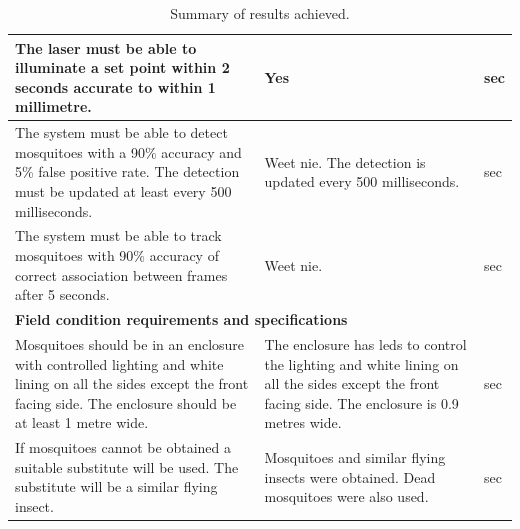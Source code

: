 \begin{table}[H]
\begin{tabularx}{\textwidth}{|X|X|l|}
    \hline
    The laser must be able to illuminate a set point within 2 seconds accurate to within 1 millimetre.                                                                           &
    Yes                                                                                                                                                                          &
    sec                                                                                                                                                                                                                                                                                                                                          \\
    \hline
    The system must be able to detect mosquitoes with a 90\% accuracy and 5\% false positive rate. The detection must be updated at least every 500 milliseconds.                & Weet nie. The detection is updated every 500 milliseconds.                                                                                              & sec \\
    \hline
    The system must be able to track mosquitoes with 90\% accuracy of correct association between frames after 5 seconds.                                                        & Weet nie.                                                                                                                                               & sec \\
    \hline
    \multicolumn{3}{|l|}{\textbf{Field condition requirements and specifications}}                                                                                                                                                                                                                                                               \\
    \hline
    Mosquitoes should be in an enclosure with controlled lighting and white lining on all the sides except the front facing side. The enclosure should be at least 1 metre wide. & The enclosure has \glspl{led} to control the lighting and white lining on all the sides except the front facing side. The enclosure is 0.9 metres wide. & sec \\
    \hline
    If mosquitoes cannot be obtained a suitable substitute will be used. The substitute will be a similar flying insect.                                                         & Mosquitoes and similar flying insects were obtained. Dead mosquitoes were also used.                                                                    & sec \\
    \hline
  \end{tabularx}
  \caption{Summary of results achieved.}
  \label{tab:results_summary}
\end{table}

